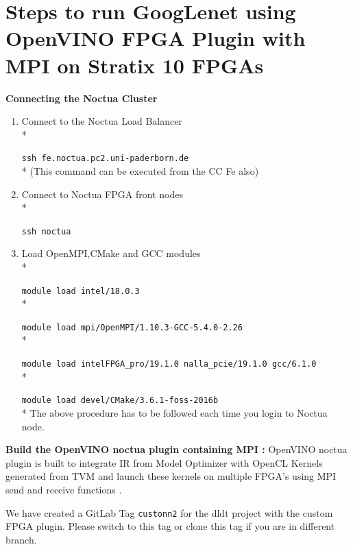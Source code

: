 \section{Steps to run GoogLenet using OpenVINO FPGA Plugin with MPI on Stratix 10 FPGAs}
\textbf{Connecting the Noctua Cluster}
\begin{enumerate}
\item Connect to the Noctua Load Balancer \\*  \raggedright\texttt{ssh fe.noctua.pc2.uni-paderborn.de} \\*  (This command can be executed from the CC Fe also)
\item Connect to Noctua FPGA front nodes \\* \raggedright\texttt{ssh noctua}
\item Load OpenMPI,CMake and GCC modules \\* \raggedright\texttt{module load intel/18.0.3} \\*  \raggedright\texttt{module load mpi/OpenMPI/1.10.3-GCC-5.4.0-2.26} \\*  \raggedright\texttt{module load intelFPGA\_pro/19.1.0 nalla\_pcie/19.1.0 gcc/6.1.0} \\*  \raggedright\texttt{module load devel/CMake/3.6.1-foss-2016b} \\*  The above procedure has to be followed each time you login to Noctua node.
\end{enumerate}

\textbf{Build the OpenVINO noctua plugin containing MPI :} OpenVINO noctua plugin is built to integrate IR from Model Optimizer with OpenCL Kernels generated from TVM and launch these kernels on multiple FPGA's using MPI send and receive functions .

We have created a GitLab Tag  \texttt{custonn2}  for the dldt project with the custom  FPGA plugin. Please switch to this tag or clone this tag if you are in different branch.

